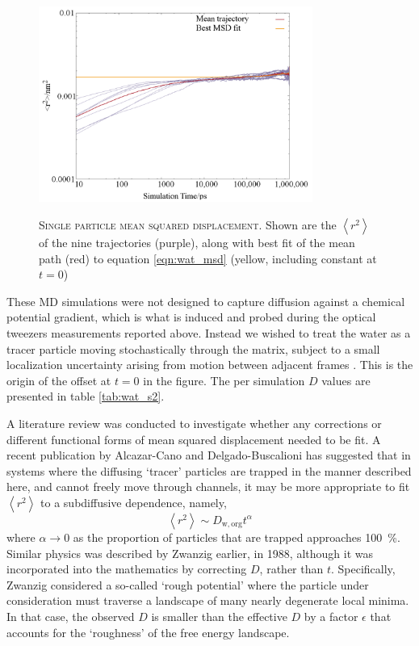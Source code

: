 \begin{figure}
    \centering
    \caption[Single particle mean squared displacement]{\textsc{Single particle mean squared displacement}. Shown are the $\left\langle r^{2}\right\rangle$ of the nine trajectories (purple), along with best fit of the mean path (red) to equation \ref{eqn:wat_msd} (yellow, including constant at $t=0$)}
    \includegraphics[width=0.8\textwidth]{chapters/water_hopping/figures/Fig_S7.png}
    \label{fig:wat_s7}
\end{figure}

These MD simulations were not designed to capture diffusion against a chemical potential gradient, which is what is induced and probed during the optical tweezers measurements reported above. Instead we wished to treat the water as a tracer particle moving stochastically through the matrix, subject to a small localization uncertainty arising from motion between adjacent frames \cite{michaletMeanSquareDisplacement2010}. This is the origin of the offset at $t=0$ in the figure. The per simulation $D$ values are presented in table \ref{tab:wat_s2}. 

A literature review was conducted to investigate whether any corrections or different functional forms of mean squared displacement needed to be fit. A recent publication \cite{alcazar-canoGeneralPhenomenologicalRelation2018} by Alcazar-Cano and Delgado-Buscalioni has suggested that in systems where the diffusing `tracer’ particles are trapped in the manner described here, and cannot freely move through channels, it may be more appropriate to fit $\left\langle r^{2}\right\rangle$ to a subdiffusive dependence, namely, 
\begin{equation}
\left\langle r^{2}\right\rangle \sim D_{\mathrm{w, org}} t^{\alpha}
\end{equation}
where $\alpha \rightarrow 0$ as the proportion of particles that are trapped approaches \SI{100}{\percent}. Similar physics was described by Zwanzig \cite{zwanzigDiffusionRoughPotential1988} earlier, in 1988, although it was incorporated into the mathematics by correcting $D$, rather than $t$. Specifically, Zwanzig considered a so-called `rough potential' where the particle under consideration must traverse a landscape of many nearly degenerate local minima. In that case, the observed $D$ is smaller than the effective $D$ by a factor $\epsilon$ that accounts for the `roughness' of the free energy landscape.

